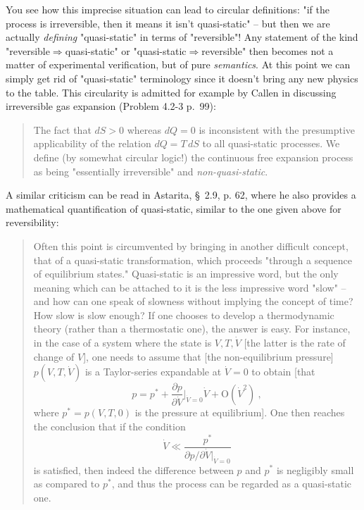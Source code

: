 \documentclass[a4paper,12pt,%
onecolumn,oneside,titlepage,%
british%
]{memoir}
\renewcommand*{\|}[1][]{\nonscript\:#1\vert\nonscript\:\mathopen{}}
\newcommand*{\sect}{\S}%
\begin{document}
You see how this imprecise situation can lead to circular definitions: "if the process is irreversible, then it means it isn't quasi-static" – but then we are actually \emph{defining} "quasi-static" in terms of "reversible"! Any statement of the kind "reversible${}\Rightarrow{}$quasi-static" or "quasi-static${}\Rightarrow{}$reversible" then becomes not a matter of experimental verification, but of pure \emph{semantics}. At this point we can simply get rid of "quasi-static" terminology since it doesn't bring any new physics to the table. This circularity is admitted for example by Callen in discussing irreversible gas expansion (Problem 4.2-3 p.~99):

\begin{quote}
  The fact that $dS > 0$ whereas $dQ = 0$ is inconsistent with the presumptive applicability of the relation $dQ = T\,dS$ to all quasi-static processes. We define (by somewhat circular logic!) the continuous free expansion process as being "essentially irreversible" and \emph{non-quasi-static}.
\end{quote}

A similar criticism can be read in Astarita, \sect~2.9, p. 62, where he also provides a mathematical quantification of quasi-static, similar to the one given above for reversibility:

\begin{quote}
  Often this point is circumvented by bringing in another difficult concept,
  that of a quasi-static transformation, which proceeds "through a sequence of
  equilibrium states." Quasi-static is an impressive word, but the only meaning
  which can be attached to it is the less impressive word "slow" – and how can
  one speak of slowness without implying the concept of time? How slow is slow
  enough? If one chooses to develop a thermodynamic theory (rather than a
  thermostatic one), the answer is easy. For instance, in the case of a system where
  the state is $V, T, \dot{V}$ [the latter is the rate of change of $V$], one needs to assume that [the non-equilibrium pressure] $p(V,T,\dot{V})$ is a Taylor-series expandable
  at $\dot{V} = 0$ to obtain [that
  $$
  p = p^* + \frac{\partial p}{\partial \dot{V}}\biggl\lvert_{\dot{V}=0}\dot{V} + \mathrm{O}(\dot{V}^2) \ ,
  $$
  where $p^* = p(V,T,0)$ is the pressure at equilibrium]. One then reaches the conclusion that if the
  condition
  $$\dot{V} \ll \frac{p^*}{\partial p/\partial \dot{V}\lvert_{\dot{V}=0}}
  $$
  is satisfied, then indeed the difference between $p$ and $p^*$ is negligibly small as compared to $p^*$, and thus the process can be regarded as a quasi-static one.
\end{quote}
\end{document}
